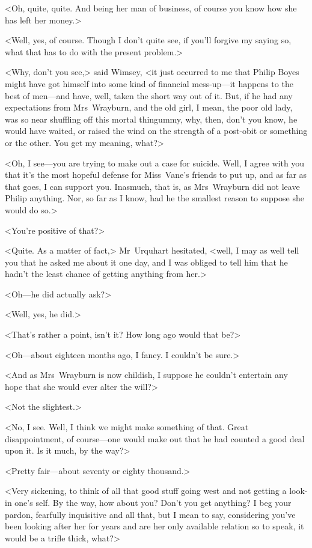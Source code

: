<Oh, quite, quite. And being her man of business, of course you know how she has left her money.>

<Well, yes, of course. Though I don't quite see, if you'll forgive my saying so, what that has to do with the present problem.>

<Why, don't you see,> said Wimsey, <it just occurred to me that Philip Boyes might have got himself into some kind of financial mess-up—it happens to the best of men—and have, well, taken the short way out of it. But, if he had any expectations from Mrs~Wrayburn, and the old girl, I mean, the poor old lady, was so near shuffling off this mortal thingummy, why, then, don't you know, he would have waited, or raised the wind on the strength of a post-obit or something or the other. You get my meaning, what?>

<Oh, I see—you are trying to make out a case for suicide. Well, I agree with you that it's the most hopeful defense for Miss~Vane's friends to put up, and as far as that goes, I can support you. Inasmuch, that is, as Mrs~Wrayburn did not leave Philip anything. Nor, so far as I know, had he the smallest reason to suppose she would do so.>

<You're positive of that?>

<Quite. As a matter of fact,> Mr~Urquhart hesitated, <well, I may as well tell you that he asked me about it one day, and I was obliged to tell him that he hadn't the least chance of getting anything from her.>

<Oh—he did actually ask?>

<Well, yes, he did.>

<That's rather a point, isn't it? How long ago would that be?>

<Oh—about eighteen months ago, I fancy. I couldn't be sure.>

<And as Mrs~Wrayburn is now childish, I suppose he couldn't entertain any hope that she would ever alter the will?>

<Not the slightest.>

<No, I see. Well, I think we might make something of that. Great disappointment, of course—one would make out that he had counted a good deal upon it. Is it much, by the way?>

<Pretty fair—about seventy or eighty thousand.>

<Very sickening, to think of all that good stuff going west and not getting a look-in one's self. By the way, how about you? Don't you get anything? I beg your pardon, fearfully inquisitive and all that, but I mean to say, considering you've been looking after her for years and are her only available relation so to speak, it would be a trifle thick, what?>

